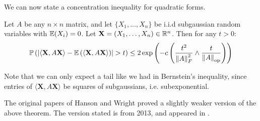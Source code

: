\documentclass[11pt]{article}
\begin{document}
We can now state a concentration inequality for quadratic forms.
\begin{theorem}
  \label{thm:hanson-wright}
  Let $A$ be any $n \times n$ matrix, and let $\{X_1, \ldots, X_n\}$ be i.i.d subgaussian random variables with $\mathbb{E}(X_i) = 0$.
  Let $\mathbf{X} = (X_1, \ldots, X_n) \in \mathbb{R}^n$. Then for any $t > 0$:
  \begin{align*}
    \mathbb{P}\left( \left| \langle \mathbf{X}, A \mathbf{X} \rangle - \mathbb{E}\left( \langle \mathbf{X}, A \mathbf{X} \rangle \right) \right| > t \right)
    \leq 2 \exp\left( -c \left( \frac{t^2}{\left\lVert A\right\rVert_F^2} \wedge \frac{t}{\left\lVert A\right\rVert_{\mathrm{op}}} \right) \right)
  \end{align*}
\end{theorem}
\begin{remark}
  Note that we can only expect a tail like we had in Bernstein's inequality, since entries of $\langle \mathbf{X}, A \mathbf{X} \rangle$ be squares of subgaussians, i.e. subexponential.
\end{remark}
\begin{remark}
  The original papers of Hanson and Wright proved a slightly weaker version of the above theorem.
  The version stated is from 2013, and appeared in \cite{rudelson2013}.
\end{remark}
\end{document}
